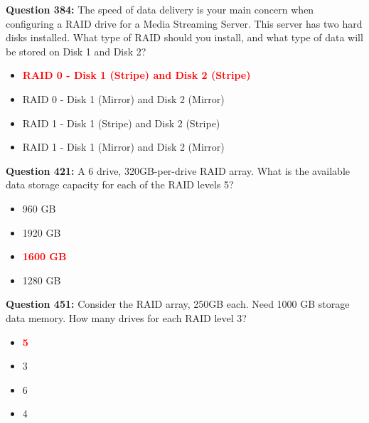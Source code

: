 \documentclass[12pt,a4paper]{article}
\begin{document}
\vspace{0.5cm}

\vspace{0.5cm}

\textbf{Question 384:} The speed of data delivery is your main concern when configuring a RAID drive for a Media Streaming Server. This server has two hard disks installed. What type of RAID should you install, and what type of data will be stored on Disk 1 and Disk 2?

\begin{itemize}
    \item[\textbf{A.}] \textcolor{red}{\textbf{RAID 0 - Disk 1 (Stripe) and Disk 2 (Stripe)}}
    \item[\textbf{B.}] RAID 0 - Disk 1 (Mirror) and Disk 2 (Mirror)
    \item[\textbf{C.}] RAID 1 - Disk 1 (Stripe) and Disk 2 (Stripe)
    \item[\textbf{D.}] RAID 1 - Disk 1 (Mirror) and Disk 2 (Mirror)
\end{itemize}

\vspace{0.5cm}

\vspace{0.5cm}

\textbf{Question 421:} A 6 drive, 320GB-per-drive RAID array. What is the available data storage capacity for each of the RAID levels 5?

\begin{itemize}
    \item[\textbf{A.}] 960 GB
    \item[\textbf{B.}] 1920 GB
    \item[\textbf{C.}] \textcolor{red}{\textbf{1600 GB}}
    \item[\textbf{D.}] 1280 GB
\end{itemize}

\vspace{0.5cm}

\vspace{0.5cm}

\vspace{0.5cm}

\vspace{0.5cm}

\textbf{Question 451:} Consider the RAID array, 250GB each. Need 1000 GB storage data memory. How many drives for each RAID level 3?

\begin{itemize}
    \item[\textbf{A.}] \textcolor{red}{\textbf{5}}
    \item[\textbf{B.}] 3
    \item[\textbf{C.}] 6
    \item[\textbf{D.}] 4
\end{itemize}
\end{document}
